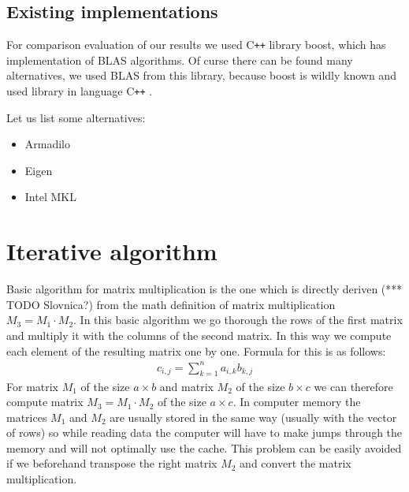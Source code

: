 \documentclass[a4paper,11pt]{article}
\newcommand{\cpp}{C\texttt{++} }
\begin{document}
\subsection{Existing implementations}

For comparison evaluation of our results we used \cpp library boost, which has implementation of BLAS algorithms. 
Of curse there can be found many alternatives, we used BLAS from this library, because boost is wildly known and used library in language \cpp.

Let us list some alternatives:
\begin{itemize}
\item 
Armadilo
\item
Eigen
\item
Intel MKL
\end{itemize}

\section{Iterative algorithm}
Basic algorithm for matrix multiplication is the one which 
is directly deriven (*** TODO Slovnica?) from the math definition of matrix multiplication $M_{3} = M_{1} \cdot M_{2}$.
In this basic algorithm we go thorough the rows of the first matrix and multiply it with the columns of the second matrix.
In this way we compute each element of the resulting matrix one by one.
Formula for this is as follows:
\begin{align*}
c_{i,j} = \sum_{k=1}^{n} a_{i,k} b_{k,j}
\end{align*}
For matrix $M_{1}$ of the size $a \times b$ and matrix $M_{2}$ of the size $b \times c$ we can therefore compute matrix $M_{3}= M_{1} \cdot M_{2}$ of the size $a \times c$.
In computer memory the matrices $M_{1}$ and $M_{2}$ are usually stored in the same way (usually with the vector of rows) so while reading data the computer will have to make jumps through the memory and will not optimally use the cache. 
This problem can be easily avoided if we beforehand transpose the right matrix $M_{2}$ and convert the matrix multiplication.
\end{document}
